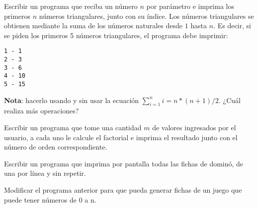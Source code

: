 \begin{ejercicio} 
Escribir un programa que reciba un número $n$ por
parámetro e imprima los primeros $n$ números triangulares, junto con su
índice. Los números triangulares se obtienen mediante la suma de los números
naturales desde $1$ hasta $n$.  Es decir, si se piden los primeros 5
números triangulares, el programa debe imprimir:

\begin{verbatim}
1 - 1
2 - 3
3 - 6
4 - 10
5 - 15
\end{verbatim}

{\bf Nota}: hacerlo usando y sin usar la ecuación $\sum_{i=1}^n i = n*(n+1)/2$.
¿Cuál realiza más operaciones?
\end{ejercicio}

\begin{ejercicio}
Escribir un programa que tome una cantidad $m$ de valores ingresados
por el usuario, a cada uno le calcule el factorial e imprima el resultado
junto con el número de orden correspondiente.
\end{ejercicio}

\begin{ejercicio}
Escribir un programa que imprima por pantalla todas las fichas de dominó, de
una por línea y sin repetir.
\end{ejercicio}

\begin{ejercicio}
Modificar el programa anterior para que pueda generar fichas de un juego
que puede tener números de 0 a n.
\end{ejercicio}
